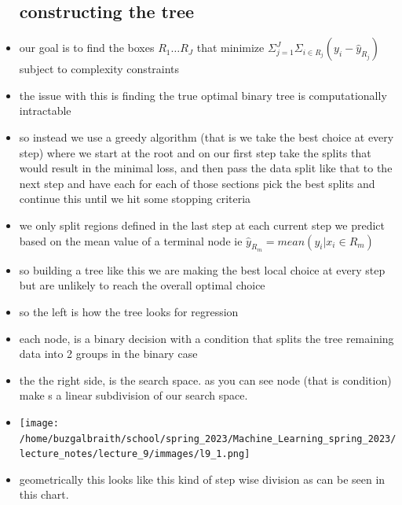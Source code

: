 \documentclass{article}
\begin{document}
\begin{itemize}
\subsection*{constructing the tree }
\item our goal is to find the boxes $R_1\dots R_J$ that minimize
 $\Sigma_{j=1}^{J}\Sigma_{i\in R_{j}}(y_i-\hat{y}_{R_{j}})$ subject to 
 complexity constraints 
\item the issue with this is finding the true optimal binary tree is computationally
intractable
\item so instead we use a greedy algorithm  (that is we take the best choice at every step)
where we start at the root and on our first step take the splits that would 
result in the minimal loss, and then pass the data split like that to the next
step and have each for each of those sections pick the best splits
and continue this until we hit some stopping criteria
\item we only split regions defined in the last step at each current step 
we predict based on the mean value of a terminal node ie $\hat{y}_{R_{m}}=mean(y_i|x_i\in R_{m})$ 
\item so building a tree like this we are making the best local choice at every step but are unlikely to reach the overall optimal choice
\item so the left is how the tree looks for regression 
\item each node, is a binary decision with a condition that splits the tree remaining data into 2 groups in the binary case 
\item the the right side, is the search space. as you can see node (that is condition) make s a linear subdivision of our search space. 
\item \texttt{[image: /home/buzgalbraith/school/spring\_2023/Machine\_Learning\_spring\_2023/lecture\_notes/lecture\_9/immages/l9\_1.png]}
\item geometrically this looks like this kind of step wise division as can be seen in this chart. 

\end{itemize}
\end{document}
